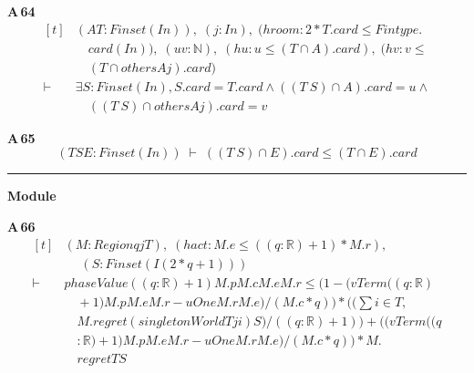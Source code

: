 \noindent\textbf{A\,64}\quad{}
{\footnotesize\[ \begin{aligned}[t]
&(\mathit{A} \mathit{T} : \mathit{Finset} (\mathit{I} \mathit{n})),\; (\mathit{j} : \mathit{I} \mathit{n}),\; (\mathit{hroom} : 2*\mathit{T}.\mathit{card} \leq \mathit{Fintype}.\\
&\quad \mathit{card} (\mathit{I} \mathit{n})),\; (\mathit{u} \mathit{v} : \mathbb{N} ),\; (\mathit{hu} : \mathit{u} \leq (\mathit{T} \cap \mathit{A}).\mathit{card}),\; (\mathit{hv} : \mathit{v} \leq\\
&\quad (\mathit{T} \cap \mathit{others} \mathit{A} \mathit{j}).\mathit{card})\\
\vdash\;&\exists \mathit{S} : \mathit{Finset} (\mathit{I} \mathit{n}), \mathit{S}.\mathit{card}=\mathit{T}.\mathit{card} \wedge ((\mathit{T} \ \mathit{S}) \cap \mathit{A}).\mathit{card}=\mathit{u} \wedge\\
&\quad ((\mathit{T} \ \mathit{S}) \cap \mathit{others} \mathit{A} \mathit{j}).\mathit{card}=\mathit{v}
\end{aligned} \]}

\noindent\textbf{A\,65}\quad{}
{\footnotesize\[ (\mathit{T} \mathit{S} \mathit{E} : \mathit{Finset} (\mathit{I} \mathit{n})) \;\vdash\; ((\mathit{T} \ \mathit{S}) \cap \mathit{E}).\mathit{card} \leq (\mathit{T} \cap \mathit{E}).\mathit{card} \]}

\vspace{4pt}\noindent\rule{\columnwidth}{0.4pt}\par\vspace{2pt}
\noindent\textbf{Module }\par\vspace{3pt}

\noindent\textbf{A\,66}\quad{}
{\footnotesize\[ \begin{aligned}[t]
&(\mathit{M} : \mathit{Region} \mathit{q} \mathit{j} \mathit{T}),\; (\mathit{hact} : \mathit{M}.\mathit{e} \leq ((\mathit{q}:\mathbb{R} )+1)*\mathit{M}.\mathit{r}),\\
&\quad \; (\mathit{S} : \mathit{Finset} (\mathit{I} (2*\mathit{q}+1)))\\
\vdash\;&\mathit{phaseValue} ((\mathit{q}:\mathbb{R} )+1) \mathit{M}.\mathit{p} \mathit{M}.\mathit{c} \mathit{M}.\mathit{e} \mathit{M}.\mathit{r} \leq (1-(\mathit{vTerm} ((\mathit{q}:\mathbb{R} )\\
&\quad +1) \mathit{M}.\mathit{p} \mathit{M}.\mathit{e} \mathit{M}.\mathit{r}-\mathit{uOne} \mathit{M}.\mathit{r} \mathit{M}.\mathit{e})/(\mathit{M}.\mathit{c}*\mathit{q}))* ((\textstyle\sum \mathit{i} \in \mathit{T},\\
&\quad \mathit{M}.\mathit{regret} (\mathit{singletonWorld} \mathit{T} \mathit{j} \mathit{i}) \mathit{S})/((\mathit{q}:\mathbb{R} )+1))+ ((\mathit{vTerm} ((\mathit{q}\\
&\quad :\mathbb{R} )+1) \mathit{M}.\mathit{p} \mathit{M}.\mathit{e} \mathit{M}.\mathit{r}-\mathit{uOne} \mathit{M}.\mathit{r} \mathit{M}.\mathit{e})/(\mathit{M}.\mathit{c}*\mathit{q}))*\mathit{M}.\\
&\quad \mathit{regret} \mathit{T} \mathit{S}
\end{aligned} \]}

